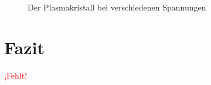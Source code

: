 \documentclass[12pt,a4paper,ngerman]{article}
\providecommand{\fehlt}{\textcolor{red}{{ ¡Fehlt! }}}
\begin{document}
\begin{figure}
		\caption{Der Plasmakristall bei verschiedenen Spannungen}
		\label{fig:Druckabnahme}
	\end{figure}

\section{Fazit}
	\fehlt

	
	





\end{document}
